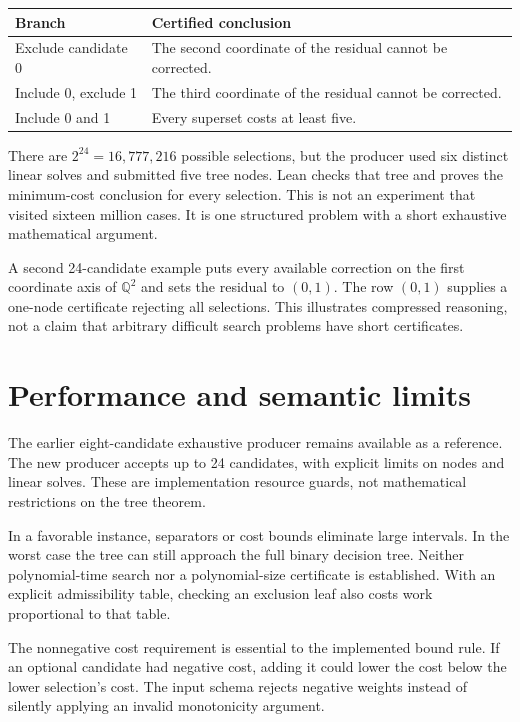 \documentclass[11pt,letterpaper,oneside,openany]{book}
\theoremstyle{quiet}
\newcommand{\Q}{\mathbb{Q}}
\begin{document}
\begin{center}
\begin{tabularx}{\linewidth}{@{}lX@{}}
\toprule Branch & Certified conclusion\\\midrule
Exclude candidate 0 & The second coordinate of the residual cannot be corrected.\\
Include 0, exclude 1 & The third coordinate of the residual cannot be corrected.\\
Include 0 and 1 & Every superset costs at least five.\\
\bottomrule
\end{tabularx}
\end{center}

There are $2^{24}=16{,}777{,}216$ possible selections, but the producer used six distinct linear solves and submitted five tree nodes. Lean checks that tree and proves the minimum-cost conclusion for every selection. This is not an experiment that visited sixteen million cases. It is one structured problem with a short exhaustive mathematical argument.

A second 24-candidate example puts every available correction on the first coordinate axis of $\Q^2$ and sets the residual to $(0,1)$. The row $(0,1)$ supplies a one-node certificate rejecting all selections. This illustrates compressed reasoning, not a claim that arbitrary difficult search problems have short certificates.

\section{Performance and semantic limits}

The earlier eight-candidate exhaustive producer remains available as a reference. The new producer accepts up to 24 candidates, with explicit limits on nodes and linear solves. These are implementation resource guards, not mathematical restrictions on the tree theorem.

In a favorable instance, separators or cost bounds eliminate large intervals. In the worst case the tree can still approach the full binary decision tree. Neither polynomial-time search nor a polynomial-size certificate is established. With an explicit admissibility table, checking an exclusion leaf also costs work proportional to that table.

The nonnegative cost requirement is essential to the implemented bound rule. If an optional candidate had negative cost, adding it could lower the cost below the lower selection's cost. The input schema rejects negative weights instead of silently applying an invalid monotonicity argument.
\end{document}

